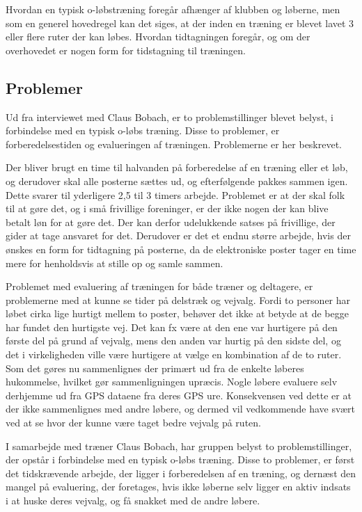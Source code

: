 Hvordan en typisk o-løbstræning foregår afhænger af klubben og løberne, men som en generel hovedregel kan det siges, at der inden en træning er blevet lavet 3 eller flere ruter der kan løbes. Hvordan tidtagningen foregår, og om der overhovedet er nogen form for tidstagning til træningen.

\subsection{Problemer}
Ud fra interviewet med Claus Bobach, er to problemstillinger blevet belyst, i forbindelse med en typisk o-løbs træning. Disse to problemer, er forberedelsestiden og evalueringen af træningen. Problemerne er her beskrevet.

Der bliver brugt en time til halvanden på forberedelse af en træning eller et løb, og derudover skal alle posterne sættes ud, og efterfølgende pakkes sammen igen. Dette svarer til yderligere 2,5 til 3 timers arbejde. \newline
Problemet er at der skal folk til at gøre det, og i små frivillige foreninger, er der ikke nogen der kan blive betalt løn for at gøre det. Der kan derfor udelukkende satses på frivillige, der gider at tage ansvaret for det. \newline
Derudover er det et endnu større arbejde, hvis der ønskes en form for tidtagning på posterne, da de elektroniske poster tager en time mere for henholdsvis at stille op og samle sammen. 

Problemet med evaluering af træningen for både træner og deltagere, er problemerne med at kunne se tider på delstræk og vejvalg. Fordi to personer har løbet cirka lige hurtigt mellem to poster, behøver det ikke at betyde at de begge har fundet den hurtigste vej. Det kan fx være at den ene var hurtigere på den første del på grund af vejvalg, mens den anden var hurtig på den sidste del, og det i virkeligheden ville være hurtigere at vælge en kombination af de to ruter. Som det gøres nu sammenlignes der primært ud fra de enkelte løberes hukommelse, hvilket gør sammenligningen upræcis. Nogle løbere evaluere selv derhjemme ud fra GPS dataene fra deres GPS ure. Konsekvensen ved dette er at der ikke sammenlignes med andre løbere, og dermed vil vedkommende have svært ved at se hvor der kunne være taget bedre vejvalg på ruten.

I samarbejde med træner Claus Bobach, har gruppen belyst to problemstillinger, der opstår i forbindelse med en typisk o-løbs træning. Disse to problemer, er først det tidskrævende arbejde, der ligger i forberedelsen af en træning, og dernæst den mangel på evaluering, der foretages, hvis ikke løberne selv ligger en aktiv indsats i at huske deres vejvalg, og få snakket med de andre løbere. 